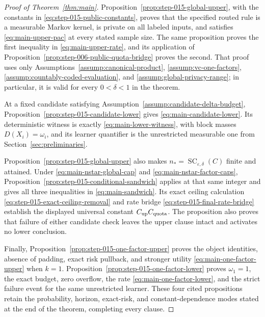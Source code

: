 \begin{proof}[Proof of Theorem~\ref{thm:main}]
Proposition~\ref{prop:step-015-global-upper}, with the constants in
\eqref{eq:step-015-public-constants}, proves that the specified routed
rule is a measurable Markov kernel, is private on all labeled inputs,
and satisfies \eqref{eq:main-upper-pac} at every stated sample size.
The same proposition proves the first inequality in
\eqref{eq:main-upper-rate}, and its application of
Proposition~\ref{prop:step-006-public-quota-bridge} proves the second.
That proof uses only Assumptions~\ref{assump:canonical-product},
\ref{assump:vc-one-factors},
\ref{assump:countably-coded-evaluation}, and
\ref{assump:global-privacy-range}; in particular, it is valid for every
\(0<\delta<1\) in the theorem.

At a fixed candidate satisfying
Assumption~\ref{assump:candidate-delta-budget},
Proposition~\ref{prop:step-015-candidate-lower} gives
\eqref{eq:main-candidate-lower}.  Its deterministic witness is exactly
\eqref{eq:main-lower-witness}, with block masses
\(D(X_i)=\omega_i\), and its learner quantifier is the unrestricted
measurable one from Section~\ref{sec:preliminaries}.

Proposition~\ref{prop:step-015-global-upper} also makes
\(n_*=\operatorname{SC}_{\varepsilon,\delta}(C)\) finite and attained.
Under \eqref{eq:main-nstar-global-cap} and
\eqref{eq:main-nstar-factor-caps},
Proposition~\ref{prop:step-015-conditional-sandwich} applies at that
same integer and gives all three inequalities in
\eqref{eq:main-sandwich}.  Its exact ceiling calculation
\eqref{eq:step-015-exact-ceiling-removal} and rate bridge
\eqref{eq:step-015-final-rate-bridge} establish the displayed universal
constant \(C_{\rm up}C_{\rm quota}\).  The proposition also proves that
failure of either candidate check leaves the upper clause intact and
activates no lower conclusion.

Finally, Proposition~\ref{prop:step-015-one-factor-upper} proves the
object identities, absence of padding, exact risk pullback, and stronger
utility \eqref{eq:main-one-factor-upper} when \(k=1\).
Proposition~\ref{prop:step-015-one-factor-lower} proves
\(\omega_1=1\), the exact budget, zero overflow, the rate
\eqref{eq:main-one-factor-lower}, and the strict failure event for the
same unrestricted learner.  These four cited propositions retain the
probability, horizon, exact-risk, and constant-dependence modes stated
at the end of the theorem, completing every clause.
\end{proof}
